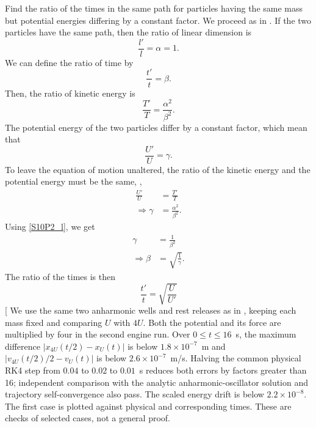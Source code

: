 \begin{problem}[title={Travel times for scaled potential energies}]
{
Find the ratio of the times in the same path for particles having the same mass but potential energies differing by a constant factor.
}
{
We proceed as in . If the two particles have the same path, then the ratio of linear dimension is
\begin{equation} \label{S10P2_l}
    \frac{l'}{l} = \alpha = 1.
\end{equation}
We can define the ratio of time by
\begin{equation*}
    \frac{t'}{t} = \beta .
\end{equation*}
Then, the ratio of kinetic energy is 
\begin{equation*}
    \frac{T'}{T} = \frac{\alpha^2}{\beta^2}.
\end{equation*}
The potential energy of the two particles differ by a constant factor, which mean that
\begin{equation*}
    \frac{U'}{U} = \gamma .
\end{equation*}
To leave the equation of motion unaltered, the ratio of the kinetic energy and the potential energy must be the same, \ie,
\begin{align*}
    \frac{U'}{U} &= \frac{T'}{T} \\
    \Rightarrow \gamma &=  \frac{\alpha^2}{\beta^2}.
\end{align*}
Using \eqref{S10P2_l}, we get
\begin{align*}
    \gamma &= \frac{1}{\beta^2} \\
    \Rightarrow \beta &= \sqrt{\frac{1}{\gamma}}.
\end{align*}
The ratio of the times is then
}
{
\begin{equation*}
    \frac{t'}{t} = \sqrt{\frac{U}{U'}}
\end{equation*}
}
[
We use the same two anharmonic wells and rest releases as in , keeping each mass fixed and comparing $U$ with $4U$. Both the potential and its force are multiplied by four in the second engine run. Over $0\leq t\leq16$~s, the maximum difference $|x_{4U}(t/2)-x_U(t)|$ is below $1.8\times10^{-7}$~m and $|v_{4U}(t/2)/2-v_U(t)|$ is below $2.6\times10^{-7}$~m/s. Halving the common physical RK4 step from $0.04$ to $0.02$ to $0.01$~s reduces both errors by factors greater than 16; independent comparison with the analytic anharmonic-oscillator solution and trajectory self-convergence also pass. The scaled energy drift is below $2.2\times10^{-8}$. The first case is plotted against physical and corresponding times. These are checks of selected cases, not a general proof.

\end{problem}
